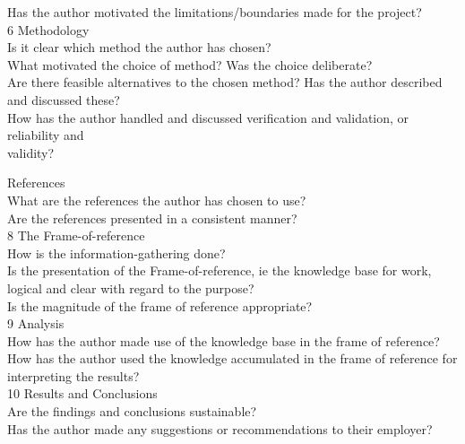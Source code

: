 \documentclass{article}
\begin{document}
Has the author motivated the limitations/boundaries made for the project?\\

6 Methodology\\

Is it clear which method the author has chosen?\\

What motivated the choice of method? Was the choice deliberate?\\

Are there feasible alternatives to the chosen method? Has the author described and discussed these?\\

How has the author handled and discussed verification and validation, or reliability and\\ validity?

References\\

What are the references the author has chosen to use?\\

Are the references presented in a consistent manner?\\

8 The Frame-of-reference\\

How is the information-gathering done?\\

Is the presentation of the Frame-of-reference, ie the knowledge base for work, logical and clear with regard to the purpose?\\

Is the magnitude of the frame of reference appropriate?\\

9 Analysis\\

How has the author made use of the knowledge base in the frame of reference?\\

How has the author used the knowledge accumulated in the frame of reference for interpreting the results?\\

10 Results and Conclusions\\

Are the findings and conclusions sustainable?\\

Has the author made any suggestions or recommendations to their employer?\\
\end{document}
